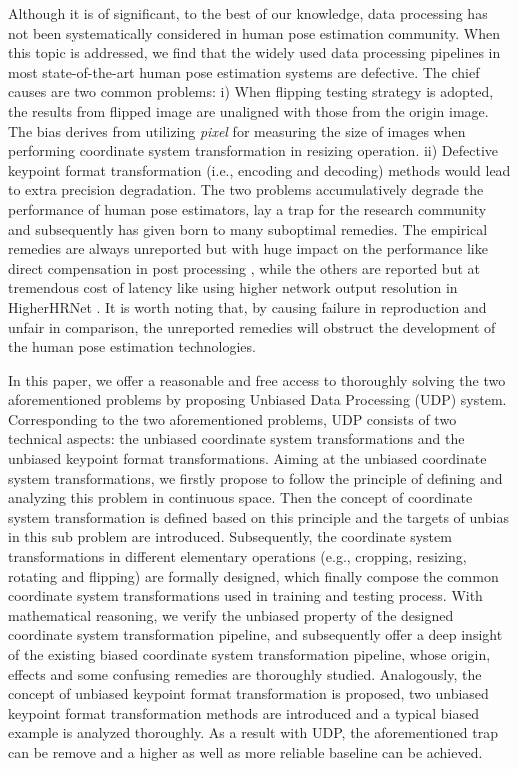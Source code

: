 \documentclass[10pt,journal,compsoc]{IEEEtran}
\begin{document}
Although it is of significant, to the best of our knowledge, data processing has not been systematically considered in human pose estimation community. When this topic is addressed, we find that the widely used data processing pipelines in most state-of-the-art human pose estimation systems \cite{CPN,SBNet,MSPN,HRNet,Higher,DARK} are defective. The chief causes are two common problems: i) When flipping testing strategy is adopted, the results from flipped image are unaligned with those from the origin image. The bias derives from utilizing \textit{pixel} for measuring the size of images when performing coordinate system transformation in resizing operation. ii) Defective keypoint format transformation (i.e., encoding and decoding) methods would lead to extra precision degradation. The two problems accumulatively degrade the performance of human pose estimators, lay a trap for the research community and subsequently has given born to many suboptimal remedies. The empirical remedies are always unreported but with huge impact on the performance like direct compensation in post processing \cite{CPN,SBNet,HRNet,MSPN,DARK,Higher}, while the others are reported but at tremendous cost of latency like using higher network output resolution in HigherHRNet \cite{Higher}. It is worth noting that, by causing failure in reproduction and unfair in comparison, the unreported remedies will obstruct the development of the human pose estimation technologies.

In this paper, we offer a reasonable and free access to thoroughly solving the two aforementioned problems by proposing Unbiased Data Processing (UDP) system. Corresponding to the two aforementioned problems, UDP consists of two technical aspects: the unbiased coordinate system transformations and the  unbiased keypoint format transformations. Aiming at the unbiased coordinate system transformations, we firstly propose to follow the principle of defining and analyzing this problem in continuous space. Then the concept of coordinate system transformation is defined based on this principle and the targets of unbias in this sub problem are introduced. Subsequently, the coordinate system transformations in different elementary operations (e.g., cropping, resizing, rotating and flipping) are formally designed, which finally compose the common coordinate system transformations used in training and testing process. With mathematical reasoning, we verify the unbiased property of the designed coordinate system transformation pipeline, and subsequently offer a deep insight of the existing biased coordinate system transformation pipeline, whose origin, effects and some confusing remedies are thoroughly studied. Analogously, the concept of unbiased keypoint format transformation is proposed, two unbiased keypoint format transformation methods are introduced and a typical biased example is analyzed thoroughly. As a result with UDP, the aforementioned trap can be remove and a higher as well as more reliable baseline can be achieved.
\end{document}
